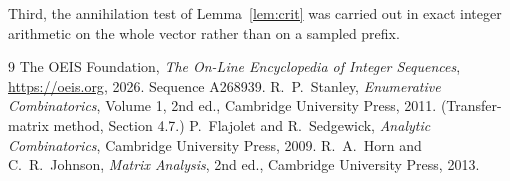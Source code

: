 \documentclass[11pt,a4paper]{article}
\theoremstyle{plain}
\theoremstyle{definition}
\begin{document}
Third, the annihilation test of Lemma~\ref{lem:crit} was carried out in exact integer
arithmetic on the whole vector rather than on a sampled prefix.

\begin{thebibliography}{9}
 The OEIS Foundation, \emph{The On-Line Encyclopedia of Integer
Sequences}, \url{https://oeis.org}, 2026. Sequence A268939.
 R.~P.~Stanley, \emph{Enumerative Combinatorics}, Volume 1, 2nd ed.,
Cambridge University Press, 2011. (Transfer-matrix method, Section 4.7.)
 P.~Flajolet and R.~Sedgewick, \emph{Analytic Combinatorics}, Cambridge
University Press, 2009.
 R.~A.~Horn and C.~R.~Johnson, \emph{Matrix Analysis}, 2nd ed., Cambridge
University Press, 2013.
\end{thebibliography}
\end{document}
